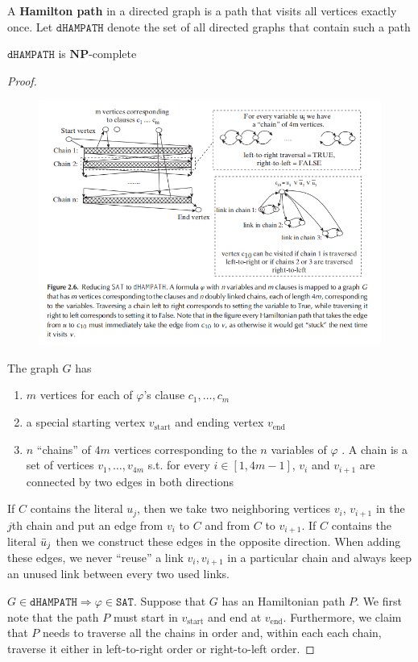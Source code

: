 \documentclass[11pt]{article}
\def \NP {\textbf{NP}}
\def \start {\text{start}}
\def \tend {\text{end}}
\def \NP {\textbf{NP}}
\def \SAT {\texttt{SAT}}
\def \dHAMPATH {\texttt{dHAMPATH}}
\begin{document}
A \textbf{Hamilton path} in a directed graph is a path that visits all vertices exactly once. Let
\(\dHAMPATH\) denote the set of all directed graphs that contain such a path
\begin{theorem}[]
\(\dHAMPATH\) is \(\NP\)-complete
\end{theorem}

\begin{proof}
\begin{figure}[htbp]
\centering
\includegraphics[width=.9\linewidth]{../images/ComputationalComplexity/8.png}
\end{figure}

The graph \(G\) has
\begin{enumerate}
\item \(m\) vertices for each of \(\varphi\)'s clause \(c_1,\dots,c_m\)
\item a special starting vertex \(v_{\start}\) and ending vertex \(v_{\tend}\)
\item \(n\) ``chains'' of \(4m\) vertices corresponding to the \(n\) variables of \(\varphi\) . A chain is a
set of vertices \(v_1,\dots,v_{4m}\) s.t. for every \(i\in[1,4m-1]\), \(v_i\)
and \(v_{i+1}\) are connected by two edges in both directions
\end{enumerate}


If \(C\) contains the literal \(u_j\), then we take two neighboring
vertices \(v_i\), \(v_{i+1}\) in the \(j\)th chain and put an edge from \(v_i\) to \(C\) and
from \(C\) to \(v_{i+1}\). If \(C\) contains the literal \(\bar{u}_j\) then we construct these
edges in the opposite direction. When adding these edges, we never ``reuse'' a
link \(v_i, v_{i+1}\) in a particular chain and always keep an unused link between every two
used links.


\(G\in\dHAMPATH\Rightarrow\varphi\in\SAT\). Suppose that \(G\) has an Hamiltonian path \(P\).
We first note that the path \(P\) must start in \(v_{\start}\) and end at \(v_{\tend}\).
Furthermore, we claim that \(P\) needs to traverse all the chains in order and, within each
each chain, traverse it either in left-to-right order or right-to-left order.
\end{proof}
\end{document}
